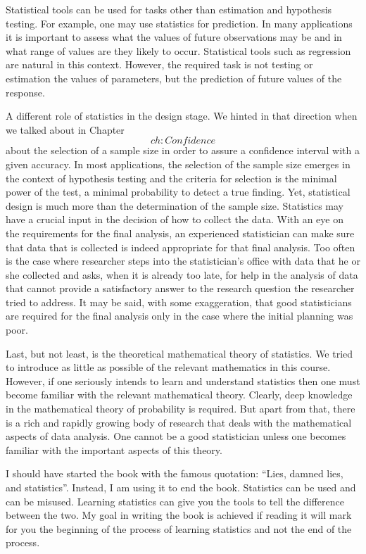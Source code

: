 \documentclass[]{krantz}
\theoremstyle{definition}
\theoremstyle{definition}
\theoremstyle{definition}
\theoremstyle{remark}
\begin{document}
Statistical tools can be used for tasks other than estimation and
hypothesis testing. For example, one may use statistics for prediction.
In many applications it is important to assess what the values of future
observations may be and in what range of values are they likely to
occur. Statistical tools such as regression are natural in this context.
However, the required task is not testing or estimation the values of
parameters, but the prediction of future values of the response.

A different role of statistics in the design stage. We hinted in that
direction when we talked about in Chapter~\[ch:Confidence\] about the
selection of a sample size in order to assure a confidence interval with
a given accuracy. In most applications, the selection of the sample size
emerges in the context of hypothesis testing and the criteria for
selection is the minimal power of the test, a minimal probability to
detect a true finding. Yet, statistical design is much more than the
determination of the sample size. Statistics may have a crucial input in
the decision of how to collect the data. With an eye on the requirements
for the final analysis, an experienced statistician can make sure that
data that is collected is indeed appropriate for that final analysis.
Too often is the case where researcher steps into the statistician's
office with data that he or she collected and asks, when it is already
too late, for help in the analysis of data that cannot provide a
satisfactory answer to the research question the researcher tried to
address. It may be said, with some exaggeration, that good statisticians
are required for the final analysis only in the case where the initial
planning was poor.

Last, but not least, is the theoretical mathematical theory of
statistics. We tried to introduce as little as possible of the relevant
mathematics in this course. However, if one seriously intends to learn
and understand statistics then one must become familiar with the
relevant mathematical theory. Clearly, deep knowledge in the
mathematical theory of probability is required. But apart from that,
there is a rich and rapidly growing body of research that deals with the
mathematical aspects of data analysis. One cannot be a good statistician
unless one becomes familiar with the important aspects of this theory.

I should have started the book with the famous quotation: ``Lies, damned
lies, and statistics''. Instead, I am using it to end the book.
Statistics can be used and can be misused. Learning statistics can give
you the tools to tell the difference between the two. My goal in writing
the book is achieved if reading it will mark for you the beginning of
the process of learning statistics and not the end of the process.
\end{document}
